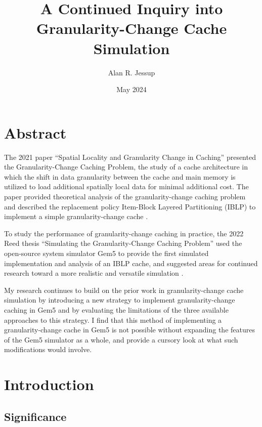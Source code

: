 \documentclass[12pt,twoside]{reedthesis}
\title{A Continued Inquiry into Granularity-Change Cache Simulation}
\author{Alan R. Jessup}
\date{May 2024}
\begin{document}
\maketitle
\frontmatter %
\pagestyle{empty}

\tableofcontents

\chapter*{Abstract}

The 2021 paper ``Spatial Locality and Granularity Change in Caching'' presented the Granularity-Change Caching Problem, the study of a cache architecture in which the shift in data granularity between the cache and main memory is utilized to load additional spatially local data for minimal additional cost. The paper provided theoretical analysis of the granularity-change caching problem and described the replacement policy Item-Block Layered Partitioning (IBLP) to implement a simple granularity-change cache \cite{beckmann}.

To study the performance of granularity-change caching in practice, the 2022 Reed thesis ``Simulating the Granularity-Change Caching Problem'' used the open-source system simulator Gem5 to provide the first simulated implementation and analysis of an IBLP cache, and suggested areas for continued research toward a more realistic and versatile simulation \cite{curtis}.

My research continues to build on the prior work in granularity-change cache simulation by introducing a new strategy to implement granularity-change caching in Gem5 and by evaluating the limitations of the three available approaches to this strategy. I find that this method of implementing a granularity-change cache in Gem5 is not possible without expanding the features of the Gem5 simulator as a whole, and provide a cursory look at what such modifications would involve.

\mainmatter
\pagestyle{fancyplain}

\chapter{Introduction}

\section{Significance}
\end{document}
